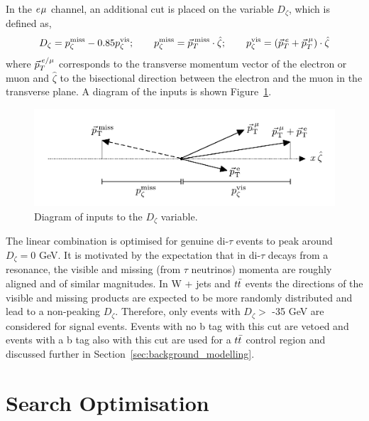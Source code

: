 In the $e_{}\mu_{}$ channel, an additional cut is placed on the variable $D_{\zeta}$, which is defined as,
\begin{equation}
D_\zeta = p_\zeta^\text{miss} - 0.85 p_\zeta^\text{vis};\qquad
p_\zeta^\text{miss} = \vec{p}_{T}^{\hspace{2pt}\text{miss}} \cdot \hat{\zeta};\qquad
p_\zeta^\text{vis} = (\vec{p}_{T}^{\hspace{2pt}e} + \vec{p}_{T}^{\hspace{2pt}\mu}) \cdot \hat{\zeta}
\label{eqn:Dzeta_def}
\end{equation}
where $\vec{p}_{T}^{\hspace{2pt}e/\mu}$ corresponds to the transverse momentum vector of the electron or muon and $\hat{\zeta}$ to the bisectional direction between the electron and the muon in the transverse plane.
A diagram of the inputs is shown Figure~\ref{fig:dzeta_diagram}. \\
\begin{figure}[!hbtp]
\centering
    \includegraphics[width=1.0\textwidth]{Figures/dzeta_diagram.pdf}
\caption{Diagram of inputs to the $D_\zeta$ variable.}
\label{fig:dzeta_diagram}
\end{figure}

The linear combination is optimised for genuine di-$\tau$ events to peak around $D_{\zeta} = 0$ GeV. 
It is motivated by the expectation that in di-$\tau$ decays from a resonance, the visible and missing (from $\tau$ neutrinos) momenta are roughly aligned and of similar magnitudes.
In W + jets and $t\bar{t}$ events the directions of the visible and missing products are expected to be more randomly distributed and lead to a non-peaking $D_{\zeta}$.
Therefore, only events with $D_\zeta >$ -35 GeV are considered for signal events.
Events with no b tag with this cut are vetoed and events with a b tag also with this cut are used for a $t\bar{t}$ control region and discussed further in Section~\ref{sec:background_modelling}.

\section{Search Optimisation}
\label{sec:search_optimisation}

